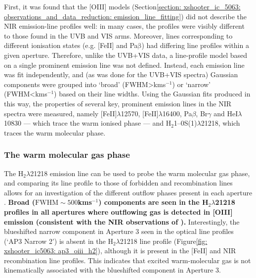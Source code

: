 First, it was found that the [OIII] models (Section\;\ref{section: xshooter_ic_5063: observations_and_data_reduction: emission_line_fitting}) did not describe the NIR emission-line profiles well: in many cases, the profiles were visibly different to those found in the UVB and VIS arms. Moreover, lines corresponding to different ionisation states (e.g. [FeII] and Pa$\mathrm{\beta}$) had differing line profiles within a given aperture. Therefore, unlike the UVB+VIS data, a line-profile model based on a single prominent emission line was not defined. Instead, each emission line was fit independently, and (as was done for the UVB+VIS spectra) Gaussian components were grouped into `broad' (\mbox{FWHM\;\textgreater{}\;km\;s$^{-1}$}) or `narrow' (\mbox{FWHM\;\textless{}\;km\;s$^{-1}$}) based on their line widths. Using the Gaussian fits produced in this way, the properties of several key, prominent emission lines in the NIR spectra were measured, namely [FeII]$\lambda$12570, [FeII]$\lambda$16400, Pa$\beta$, Br$\gamma$ and HeI$\lambda$10830 --- which trace the warm ionised phase --- and H$_2$1--0S(1)$\lambda$21218, which traces the warm molecular phase.

\subsubsection{The warm molecular gas phase}
\label{section: xshooter_ic5063: properties_of_outflowing_gas: nir_analysis_and_results: warm_molecular}

The H$_2 \lambda$21218 emission line can be used to probe the warm molecular gas phase, and comparing its line profile to those of forbidden and recombination lines allows for an investigation of the different outflow phases present in each aperture \citep{Tadhunter2014}. \textbf{Broad ($\mathrm{FWHM}\sim500$\;km\;s$^{-1}$) components are seen in the H$_2 \lambda$21218 profiles in all apertures where outflowing gas is detected in [OIII] emission (consistent with the NIR observations of \citealt{Tadhunter2014}).} Interestingly, the blueshifted narrow component in Aperture 3 seen in the optical line profiles (`AP3 Narrow 2') is absent in the H$_2 \lambda$21218 line profile (Figure\;\ref{fig: xshooter_ic5063: ap3_oiii_h2}), although it is present in the [FeII] and NIR recombination line profiles. This indicates that excited warm-molecular gas is not kinematically associated with the blueshifted component in Aperture 3.

